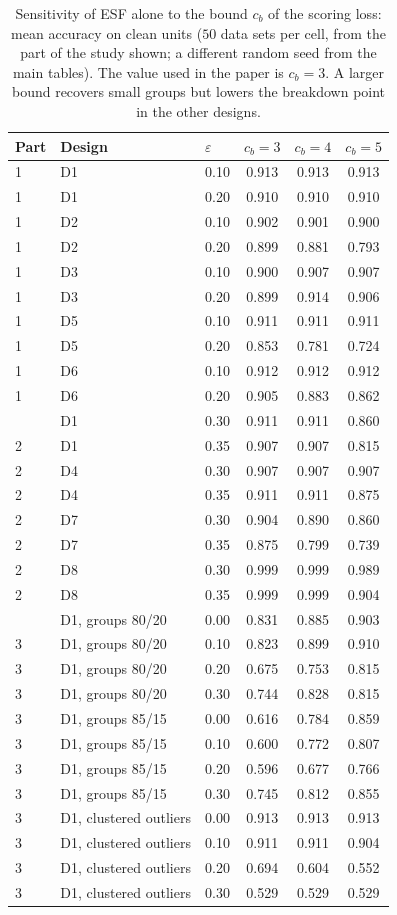 \begin{table}[htbp]
\centering
\small
\caption{Sensitivity of ESF alone to the bound $c_b$ of the scoring loss: mean accuracy on clean units ($50$ data sets per cell, from the part of the study shown; a different random seed from the main tables). The value used in the paper is $c_b=3$. A larger bound recovers small groups but lowers the breakdown point in the other designs.}
\label{tab:S13}
\begin{tabular}{lllccc}
\toprule
Part & Design & $\varepsilon$ & $c_b=3$ & $c_b=4$ & $c_b=5$ \\
\midrule
1 & D1 & 0.10 & 0.913 & 0.913 & 0.913 \\
1 & D1 & 0.20 & 0.910 & 0.910 & 0.910 \\
1 & D2 & 0.10 & 0.902 & 0.901 & 0.900 \\
1 & D2 & 0.20 & 0.899 & 0.881 & 0.793 \\
1 & D3 & 0.10 & 0.900 & 0.907 & 0.907 \\
1 & D3 & 0.20 & 0.899 & 0.914 & 0.906 \\
1 & D5 & 0.10 & 0.911 & 0.911 & 0.911 \\
1 & D5 & 0.20 & 0.853 & 0.781 & 0.724 \\
1 & D6 & 0.10 & 0.912 & 0.912 & 0.912 \\
1 & D6 & 0.20 & 0.905 & 0.883 & 0.862 \\
\addlinespace
2 & D1 & 0.30 & 0.911 & 0.911 & 0.860 \\
2 & D1 & 0.35 & 0.907 & 0.907 & 0.815 \\
2 & D4 & 0.30 & 0.907 & 0.907 & 0.907 \\
2 & D4 & 0.35 & 0.911 & 0.911 & 0.875 \\
2 & D7 & 0.30 & 0.904 & 0.890 & 0.860 \\
2 & D7 & 0.35 & 0.875 & 0.799 & 0.739 \\
2 & D8 & 0.30 & 0.999 & 0.999 & 0.989 \\
2 & D8 & 0.35 & 0.999 & 0.999 & 0.904 \\
\addlinespace
3 & D1, groups 80/20 & 0.00 & 0.831 & 0.885 & 0.903 \\
3 & D1, groups 80/20 & 0.10 & 0.823 & 0.899 & 0.910 \\
3 & D1, groups 80/20 & 0.20 & 0.675 & 0.753 & 0.815 \\
3 & D1, groups 80/20 & 0.30 & 0.744 & 0.828 & 0.815 \\
3 & D1, groups 85/15 & 0.00 & 0.616 & 0.784 & 0.859 \\
3 & D1, groups 85/15 & 0.10 & 0.600 & 0.772 & 0.807 \\
3 & D1, groups 85/15 & 0.20 & 0.596 & 0.677 & 0.766 \\
3 & D1, groups 85/15 & 0.30 & 0.745 & 0.812 & 0.855 \\
3 & D1, clustered outliers & 0.00 & 0.913 & 0.913 & 0.913 \\
3 & D1, clustered outliers & 0.10 & 0.911 & 0.911 & 0.904 \\
3 & D1, clustered outliers & 0.20 & 0.694 & 0.604 & 0.552 \\
3 & D1, clustered outliers & 0.30 & 0.529 & 0.529 & 0.529 \\
\bottomrule
\end{tabular}
\end{table}